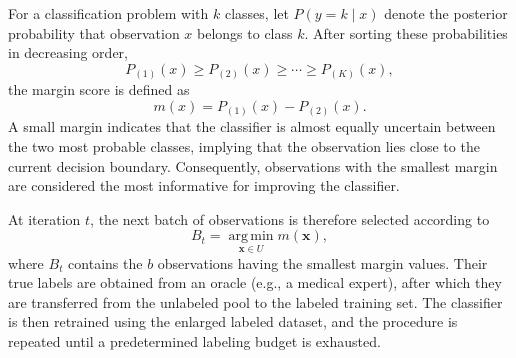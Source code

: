 \documentclass[twoside]{article}
\begin{document}
For a classification problem with $k$ classes, let
$
P(y=k\mid x)
$
denote the posterior probability that observation $x$ belongs to class $k$. After sorting these probabilities in decreasing order,
\begin{equation*}
P_{(1)}(x)\ge P_{(2)}(x)\ge\cdots\ge P_{(K)}(x),
\end{equation*}
the margin score is defined as
\begin{equation*}
m(x)= P_{(1)}(x)- P_{(2)}(x). 
\end{equation*}
A small margin indicates that the classifier is almost equally uncertain between the two most probable classes, implying that the observation lies close to the current decision boundary. Consequently, observations with the smallest margin are considered the most informative for improving the classifier.

At iteration $t$, the next batch of observations is therefore selected according to
\begin{equation*}
B_t= \operatorname*{arg\,min}_{\mathbf{x}\in U} m(\mathbf{x}), 
\end{equation*}
where $B_t$ contains the $b$ observations having the smallest margin values. Their true labels are obtained from an oracle (e.g., a medical expert), after which they are transferred from the unlabeled pool to the labeled training set. The classifier is then retrained using the enlarged labeled dataset, and the procedure is repeated until a predetermined labeling budget is exhausted.
\end{document}

